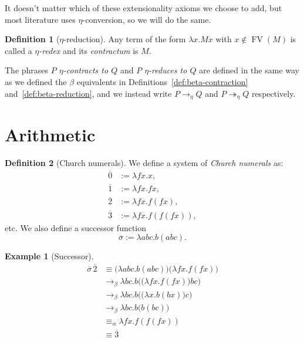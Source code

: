 \documentclass[a4paper, 11pt]{article}
\theoremstyle{plain}
\theoremstyle{definition}
\newtheorem{defn}{Definition}[section]
\newtheorem{example}{Example}[section]
\theoremstyle{remark}
\newcommand\acong{\equiv_\alpha}
\newcommand\bcon{\mathrel{\rightarrow_\beta}}
\newcommand\econ{\mathrel{\rightarrow_\eta}}
\newcommand\ered{\mathrel{\twoheadrightarrow_\eta}}
\newcommand\FV{\operatorname{FV}}
\begin{document}
It doesn't matter which of these extensionality axioms we choose to add, but most literature uses $\eta$-conversion, so we will do the same.

\begin{defn}[$\eta$-reduction]
Any term of the form $\lambda x . M x$ with ${x \notin \FV(M)}$ is called a \textit{$\eta$-redex} and its \textit{contractum} is $M$.

The phrases \textit{$P$ $\eta$-contracts to $Q$} and \textit{$P$ $\eta$-reduces to $Q$} are defined in the same way as we defined the $\beta$ equivalents in Definitions~\ref{def:beta-contraction} and~\ref{def:beta-reduction}, and we instead write $P \econ Q$ and $P \ered Q$ respectively.
\end{defn}



\section{Arithmetic}\label{sec:arithmetic}

\begin{defn}[Church numerals]
\parencites[p.~28]{church-1941-calculi-lambda-conversion}[p.~48]{hindley-seldin-2008-lambda-calculus-and-combinators}
We define a system of \textit{Church numerals} as:
\begin{align*}
\overline 0 &:= \lambda fx . x, \\
\overline 1 &:= \lambda fx . fx, \\
\overline 2 &:= \lambda fx . f(fx), \\
\overline 3 &:= \lambda fx . f(f(fx)),
\end{align*}
etc. We also define a successor function \[
\overline \sigma := \lambda abc . b(abc).
\]
\end{defn}

\begin{example}[Successor]
\begin{align*}
\overline \sigma \, \overline 2 &\equiv \big( \lambda abc . b(abc) \big) \big( \lambda fx . f(fx) \big) \\
&\bcon \lambda bc . b \big( \big( \lambda fx . f(fx) \big) bc \big) \\
&\bcon \lambda bc . b \big( \big( \lambda x . b(bx) \big) c \big) \\
&\bcon \lambda bc . b \big( b(bc) \big) \\
&\acong \lambda fx . f (f(fx)) \\
&\equiv \overline 3
\end{align*}
\end{example}
\end{document}
